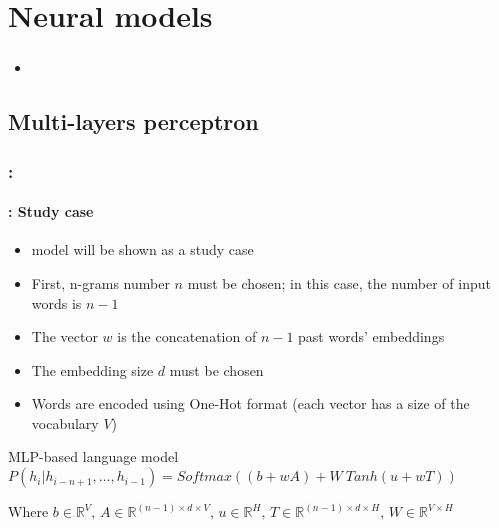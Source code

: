 \documentclass[xcolor=table]{beamer}
\begin{document}
\section{Neural models}

\begin{frame}
	\frametitle{\insertshortsubtitle}
	\framesubtitle{\insertsection}

\begin{itemize}
	\item 
\end{itemize}

\end{frame}

\subsection{Multi-layers perceptron}

\begin{frame}
	\frametitle{\insertshortsubtitle: \insertsection}
	\framesubtitle{\insertsubsection: Study case}

	\begin{itemize}
		\item \cite{2003-bengio-al} model will be shown as a study case
		\item First, n-grams number $n$ must be chosen; in this case, the number of input words is $n-1$
		\item The vector $w$ is the concatenation of $n-1$ past words' embeddings
		\item The embedding size $d$ must be chosen  
		\item Words are encoded using One-Hot format (each vector has a size of the vocabulary $V$)
	\end{itemize}
	
	\begin{block}{MLP-based language model}
		$
		P(h_i|h_{i-n+1},\ldots, h_{i-1}) = 
		Softmax \left(
		(b + w A) 
		+ 
		W\ Tanh(u + w T)
		\right)
		$
		
		Where $b \in \mathbb{R}^{V},\, A \in \mathbb{R}^{(n-1) \times d \times V},\, u \in \mathbb{R}^{H},\, T \in \mathbb{R}^{(n-1) \times d \times H},\, W \in \mathbb{R}^{V \times H}$
	\end{block}

\end{frame}
\end{document}
